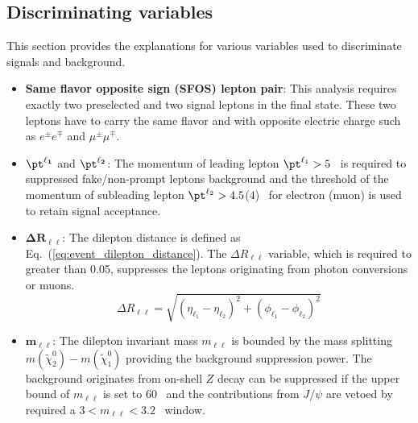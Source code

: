 \subsection{Discriminating variables}
\label{subsec:event_discriminating_variables}
This section provides the explanations for various variables used to discriminate signals and background.
%
\begin{itemize}
    \item \textbf{Same flavor opposite sign (SFOS) lepton pair}: This analysis requires exactly two preselected and two signal leptons in the final state.
    These two leptons have to carry the same flavor and with opposite electric charge such as $e^{\pm}e^{\mp}$ and $\mu^{\pm}\mu^{\mp}$.

    \item $\mathbf{\pt^{\ell_{1}}}$ and $\mathbf{\pt^{\ell_{2}}}$: The momentum of leading lepton $\pt^{\ell_{1}} > 5$~{\GeV} is required to suppressed fake/non-prompt leptons background and the threshold of the momentum of subleading lepton $\pt^{\ell_{2}} > 4.5$(4)~{\GeV} for electron (muon) is used to retain signal acceptance.

    \item $\mathbf{\Delta R_{\ell\ell}}$: The dilepton distance is defined as Eq.~(\ref{eq:event_dilepton_distance}).
    The $\Delta R_{\ell\ell}$ variable, which is required to greater than 0.05, suppresses the leptons originating from photon conversions or muons.
    \begin{equation}
        \Delta R_{\ell \ell} = \sqrt{(\eta_{\ell_{1}} - \eta_{\ell_{2}})^{2} + (\phi_{\ell_{1}} - \phi_{\ell_{2}})^{2}}
        \label{eq:event_dilepton_distance}
    \end{equation}

    \item $\mathbf{m_{\ell\ell}}$: The dilepton invariant mass $m_{\ell\ell}$ is bounded by the mass splitting $m(\widetilde{\chi}^{0}_{2}) - m(\widetilde{\chi}^{0}_{1})$ providing the background suppression power.
    The background originates from on-shell $Z$ decay can be suppressed if the upper bound of $m_{\ell\ell}$ is set to 60~{\GeV} and the contributions from $J/\psi$ are vetoed by required a $3 < m_{\ell\ell} < 3.2$~{\GeV} window.


\end{itemize}
